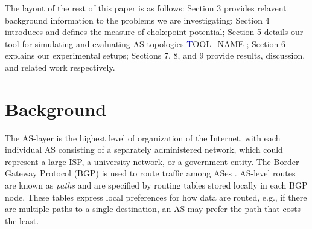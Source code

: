 \documentclass[10pt, conference, letterpaper]{IEEEtran}
\newcommand{\toolname}{{\textcolor{blue}TOOL\_NAME }}
\begin{document}
\par
The layout of the rest of this paper is as follows: Section 3 provides relavent background information
to the problems we are investigating; Section 4 introduces and defines the measure of chokepoint
potential; Section 5 details our tool for simulating and evaluating AS topologies \toolname; Section 6
explains our experimental setups; Sections 7, 8, and 9 provide results, discussion, and related work
respectively.

\section{Background}

The AS-layer is the highest level of organization of the Internet, with each individual AS consisting of a separately administered network, which could represent a large ISP, a university network, or a government entity. The Border Gateway Protocol (BGP) is used to route traffic among ASes \cite{bgp}.  AS-level routes are known as \emph{paths} and are specified by routing tables stored locally in each BGP node.  These tables express local preferences for how data are routed, e.g., if there are multiple paths to a single destination, an AS may prefer the path that costs the least.
\end{document}
